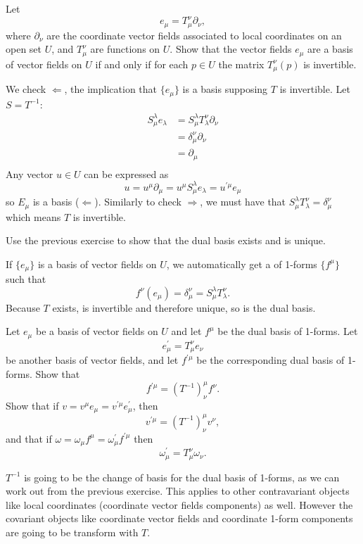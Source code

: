 \documentclass[10pt]{article}
\begin{document}
\begin{example}
	Let
	$$
		e_\mu = T_\mu^\nu \partial_\nu,
	$$
	where $\partial_\nu$ are the coordinate vector fields associated to local coordinates on an open set $U$, and $T_\mu^\nu$ are functions on $U$. Show that the vector fields $e_\mu$ are a basis of vector fields on $U$ if and only if for each $p \in U$ the matrix $T_\mu^\nu(p)$ is invertible.
\end{example}
\sol We check $\Leftarrow$, the implication that $\{e_\mu\}$ is a basis supposing $T$ is invertible. Let $S = T^{-1}$:
$$
\begin{aligned}
	S_\mu^\lambda e_\lambda &= S_\mu^\lambda T_\lambda^\nu \partial_\nu\\
	&= \delta_\mu^\nu \partial_\nu\\
	&= \partial_\mu\\
\end{aligned}
$$
Any vector $u \in U$ can be expressed as
$$
	u = u^\mu \partial_\mu = u^\mu S_\mu^\lambda e_\lambda = u^{\prime\mu} e_\mu
$$
so ${E_\mu}$ is a basis ($\Leftarrow$). Similarly to check $\Rightarrow$, we must have that $S_\mu^\lambda T_\lambda^\nu = \delta_\mu^\nu$ which means $T$ is invertible.


\begin{example}
	Use the previous exercise to show that the dual basis exists and is unique.
\end{example}
\sol If $\{e_\mu\}$ is a basis of vector fields on $U$, we automatically get a  of 1-forms $\{f^\mu\}$ such that
$$
	f^\nu(e_\mu) = \delta_\mu^\nu = S_\mu^\lambda T_\lambda^\nu.
$$
Because $T$ exists, is invertible and therefore unique, so is the dual basis.


\begin{example}
	Let $e_\mu$ be a basis of vector fields on $U$ and let $f^\mu$ be the dual basis of 1-forms. Let
	$$
		e^\prime_\mu = T_\mu^\nu e_\nu
	$$
	be another basis of vector fields, and let $f^{\prime\mu}$ be the corresponding dual basis of 1-forms. Show that
	$$
		f^{\prime\mu} = (T^{-1})^\mu_\nu f^\nu.
	$$
	Show that if $v=v^\mu e_\mu = v^{\prime\mu} e^\prime_\mu$, then
	$$
		v^{\prime\mu} = (T^{-1})^\mu_\nu v^\nu,
	$$
	and that if $\omega=\omega_\mu f^\mu = \omega^\prime_\mu f^{\prime\mu}$ then
	$$
		\omega^\prime_\mu = T^\nu_\mu \omega_\nu.
	$$
\end{example}
\sol $T^{-1}$ is going to be the change of basis for the dual basis of 1-forms, as we can work out from the previous exercise. This applies to other contravariant objects like local coordinates (coordinate vector fields components) as well. However the covariant objects like coordinate vector fields and coordinate 1-form components are going to be transform with $T$.
\end{document}
